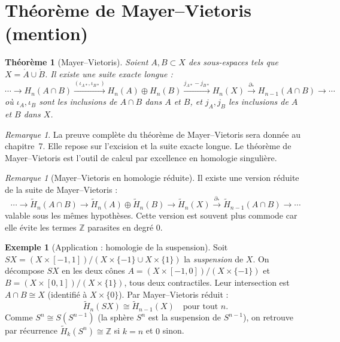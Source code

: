 \documentclass[12pt,a4paper,openany]{book}
\theoremstyle{definition}
\newtheorem{exemple}[definition]{Exemple}
\theoremstyle{plain}
\newtheorem{theoreme}[definition]{Théorème}
\theoremstyle{remark}
\newtheorem{remarque}[definition]{Remarque}
\newcommand{\Z}{\mathbb{Z}}
\begin{document}
\section{Théorème de Mayer--Vietoris (mention)}\label{sec:mayer-vietoris-mention}

\begin{theoreme}[Mayer--Vietoris]\label{thm:mayer-vietoris-mention}
Soient $A, B \subset X$ des sous-espaces tels que $X = \mathring{A} \cup \mathring{B}$.
Il existe une suite exacte longue :
\[
  \cdots \to H_n(A \cap B) \xrightarrow{(\iota_{A*}, \iota_{B*})} H_n(A) \oplus H_n(B) \xrightarrow{j_{A*} - j_{B*}} H_n(X) \xrightarrow{\partial_*} H_{n-1}(A \cap B) \to \cdots
\]
où $\iota_A, \iota_B$ sont les inclusions de $A \cap B$ dans $A$ et $B$, et $j_A, j_B$ les
inclusions de $A$ et $B$ dans $X$.
\end{theoreme}

\begin{remarque}\label{rem:mv-preuve-ch7}
La preuve complète du théorème de Mayer--Vietoris sera donnée au chapitre~7.
Elle repose sur l'excision et la suite exacte longue. Le théorème de
Mayer--Vietoris est l'outil de calcul par excellence en homologie singulière.
\end{remarque}

\begin{remarque}[Mayer--Vietoris en homologie réduite]\label{rem:mv-reduite}
Il existe une version réduite de la suite de Mayer--Vietoris :
\[
  \cdots \to \widetilde{H}_n(A \cap B) \to \widetilde{H}_n(A) \oplus \widetilde{H}_n(B) \to \widetilde{H}_n(X) \xrightarrow{\partial_*} \widetilde{H}_{n-1}(A \cap B) \to \cdots
\]
valable sous les mêmes hypothèses. Cette version est souvent plus commode car elle
évite les termes $\Z$ parasites en degré $0$.
\end{remarque}

\begin{exemple}[Application : homologie de la suspension]\label{ex:homologie-suspension}
Soit $SX = (X \times [-1,1])/(X \times \{-1\} \cup X \times \{1\})$ la \emph{suspension} de $X$.
On décompose $SX$ en les deux cônes $A = (X \times [-1, 0])/(X \times \{-1\})$ et
$B = (X \times [0, 1])/(X \times \{1\})$, tous deux contractiles. Leur intersection est
$A \cap B \cong X$ (identifié à $X \times \{0\}$). Par Mayer--Vietoris réduit :
\[
  \widetilde{H}_n(SX) \cong \widetilde{H}_{n-1}(X) \quad \text{pour tout } n.
\]
Comme $S^n \cong S(S^{n-1})$ (la sphère $S^n$ est la suspension de $S^{n-1}$), on retrouve
par récurrence $\widetilde{H}_k(S^n) \cong \Z$ si $k = n$ et $0$ sinon.
\end{exemple}
\end{document}
